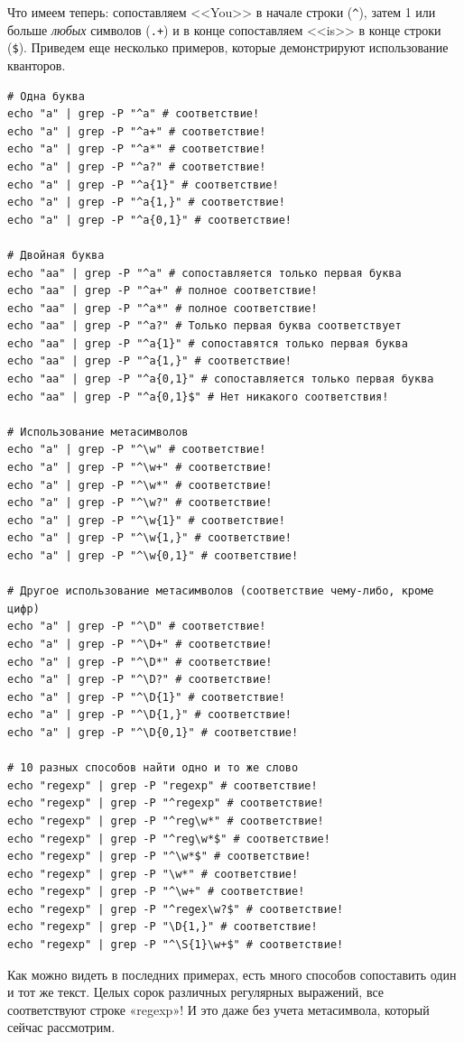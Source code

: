 \documentclass[12pt]{article}
\begin{document}
Что имеем теперь: сопоставляем <<You>> в начале строки (\texttt{\^{}}),
затем 1 или больше \emph{любых} символов (\texttt{.+}) и в конце
сопоставляем <<is>> в конце строки (\texttt{\$}). Приведем еще несколько
примеров, которые демонстрируют использование кванторов.
\begin{verbatim}
# Одна буква
echo "a" | grep -P "^a" # соответствие!
echo "a" | grep -P "^a+" # соответствие!
echo "a" | grep -P "^a*" # соответствие!
echo "a" | grep -P "^a?" # соответствие!
echo "a" | grep -P "^a{1}" # соответствие!
echo "a" | grep -P "^a{1,}" # соответствие!
echo "a" | grep -P "^a{0,1}" # соответствие!

# Двойная буква
echo "aa" | grep -P "^a" # сопоставляется только первая буква
echo "aa" | grep -P "^a+" # полное соответствие!
echo "aa" | grep -P "^a*" # полное соответствие!
echo "aa" | grep -P "^a?" # Только первая буква соответствует
echo "aa" | grep -P "^a{1}" # сопоставятся только первая буква
echo "aa" | grep -P "^a{1,}" # соответствие!
echo "aa" | grep -P "^a{0,1}" # сопоставляется только первая буква
echo "aa" | grep -P "^a{0,1}$" # Нет никакого соответствия!

# Использование метасимволов
echo "a" | grep -P "^\w" # соответствие!
echo "a" | grep -P "^\w+" # соответствие!
echo "a" | grep -P "^\w*" # соответствие!
echo "a" | grep -P "^\w?" # соответствие!
echo "a" | grep -P "^\w{1}" # соответствие!
echo "a" | grep -P "^\w{1,}" # соответствие!
echo "a" | grep -P "^\w{0,1}" # соответствие!

# Другое использование метасимволов (соответствие чему-либо, кроме цифр)
echo "a" | grep -P "^\D" # соответствие!
echo "a" | grep -P "^\D+" # соответствие!
echo "a" | grep -P "^\D*" # соответствие!
echo "a" | grep -P "^\D?" # соответствие!
echo "a" | grep -P "^\D{1}" # соответствие!
echo "a" | grep -P "^\D{1,}" # соответствие!
echo "a" | grep -P "^\D{0,1}" # соответствие!

# 10 разных способов найти одно и то же слово
echo "regexp" | grep -P "regexp" # соответствие!
echo "regexp" | grep -P "^regexp" # соответствие!
echo "regexp" | grep -P "^reg\w*" # соответствие!
echo "regexp" | grep -P "^reg\w*$" # соответствие!
echo "regexp" | grep -P "^\w*$" # соответствие!
echo "regexp" | grep -P "\w*" # соответствие!
echo "regexp" | grep -P "^\w+" # соответствие!
echo "regexp" | grep -P "^regex\w?$" # соответствие!
echo "regexp" | grep -P "\D{1,}" # соответствие!
echo "regexp" | grep -P "^\S{1}\w+$" # соответствие!
\end{verbatim}
Как можно видеть в последних примерах, есть много способов
сопоставить один и тот же текст. Целых сорок различных регулярных
выражений, все соответствуют строке «regexp»! И это даже без учета
метасимвола, который сейчас рассмотрим.
\end{document}
